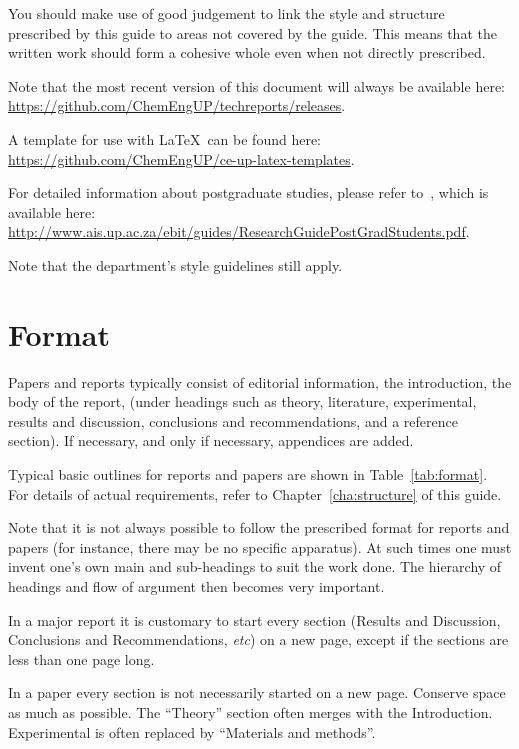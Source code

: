\documentclass[a5paper, 10pt]{article}
\begin{document}
You should make use of good judgement to link the style and
structure prescribed by this guide to areas not covered by the guide.
This means that the written work should form a cohesive whole even
when not directly prescribed.

Note that the most recent version of this document will always be available
here:\\
\url{https://github.com/ChemEngUP/techreports/releases}.

A template for use with \LaTeX\ can be found here:\\
\url{https://github.com/ChemEngUP/ce-up-latex-templates}.

For detailed information about postgraduate studies,
please refer to~\citet{buys}, which is available here:\\
\url{http://www.ais.up.ac.za/ebit/guides/ResearchGuidePostGradStudents.pdf}.

Note that the department's style guidelines still apply.


\section{Format}
\label{cha:format}
Papers and reports typically consist of editorial information, the
introduction, the body of the report, (under headings such as theory,
literature, experimental, results and discussion, conclusions and recommendations, and a reference section).
If necessary, and only if necessary, appendices are added.

Typical basic outlines for reports and papers are shown in
Table~\ref{tab:format}.
For details of actual requirements, refer to
Chapter~\ref{cha:structure} of this guide.  

Note that it is not always possible to follow the prescribed format for reports and papers (for instance, there may be no specific apparatus).  
At such times one must invent one's own main and sub-headings to suit the work done.  
The hierarchy of headings and flow of argument then becomes very important.

In a major report it is customary to start every section (Results and Discussion,
Conclusions and Recommendations, \textit{etc}) on a new page, except if the sections are less than one page long.

In a paper every section is not necessarily started on a new page.
Conserve space as much as possible. The ``Theory'' section often merges with the
Introduction. Experimental is often replaced by ``Materials and methods''.
\end{document}
